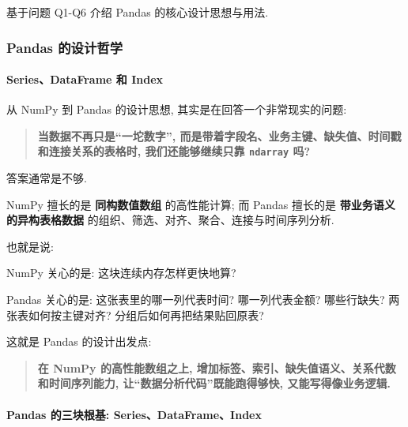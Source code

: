 \documentclass[11pt]{article}
\newenvironment{Shaded}{}{}
\newcommand{\NormalTok}[1]{{#1}}
\begin{document}
基于问题 Q1-Q6 介绍 Pandas 的核心设计思想与用法.

    \subsubsection{Pandas
的设计哲学}\label{pandas-ux7684ux8bbeux8ba1ux54f2ux5b66}

    \paragraph{Series、DataFrame 和
Index}\label{seriesdataframe-ux548c-index}

    从 NumPy 到 Pandas 的设计思想, 其实是在回答一个非常现实的问题:

\begin{quote}
\textbf{当数据不再只是``一坨数字'',
而是带着字段名、业务主键、缺失值、时间戳和连接关系的表格时,
我们还能够继续只靠 \texttt{ndarray} 吗?}
\end{quote}

答案通常是不够.

NumPy 擅长的是 \textbf{同构数值数组} 的高性能计算; 而 Pandas 擅长的是
\textbf{带业务语义的异构表格数据}
的组织、筛选、对齐、聚合、连接与时间序列分析.

也就是说:

\begin{Shaded}
\begin{Highlighting}[]
\NormalTok{NumPy 关心的是:}
\NormalTok{这块连续内存怎样更快地算? }

\NormalTok{Pandas 关心的是:}
\NormalTok{这张表里的哪一列代表时间? }
\NormalTok{哪一列代表金额? }
\NormalTok{哪些行缺失? }
\NormalTok{两张表如何按主键对齐? }
\NormalTok{分组后如何再把结果贴回原表? }
\end{Highlighting}
\end{Shaded}

这就是 Pandas 的设计出发点:

\begin{quote}
\textbf{在 NumPy 的高性能数组之上,
增加标签、索引、缺失值语义、关系代数和时间序列能力,
让``数据分析代码''既能跑得够快, 又能写得像业务逻辑.}
\end{quote}

    \paragraph{Pandas 的三块根基:
Series、DataFrame、Index}\label{pandas-ux7684ux4e09ux5757ux6839ux57fa-seriesdataframeindex}
\end{document}
